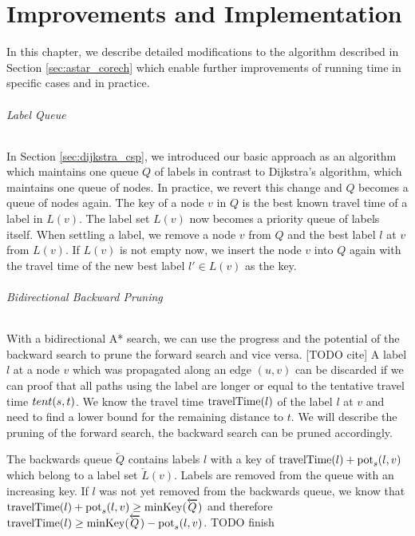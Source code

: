 
\chapter{Improvements and Implementation\label{ch:impl}}
In this chapter, we describe detailed modifications to the algorithm described in Section \ref{sec:astar_corech} which enable further improvements of running time in specific cases and in practice.

\subparagraph{Label Queue}
In Section \ref{sec:dijkstra_csp}, we introduced our basic approach as an algorithm which maintains one queue $Q$ of labels in contrast to Dijkstra's algorithm, which maintains one queue of nodes. In practice, we revert this change and $Q$ becomes a queue of nodes again. The key of a node $v$ in $Q$ is the best known travel time of a label in $L(v)$. The label set $L(v)$ now becomes a priority queue of labels itself. When settling a label, we remove a node $v$ from $Q$ and the best label $l$ at $v$ from $L(v)$. If $L(v)$ is not empty now, we insert the node $v$ into $Q$ again with the travel time of the new best label $l' \in L(v)$ as the key.

\subparagraph{Bidirectional Backward Pruning}
With a bidirectional A* search, we can use the progress and the potential of the backward search to prune the forward search and vice versa. [TODO cite] A label $l$ at a node $v$ which was propagated along an edge $(u,v)$ can be discarded if we can proof that all paths using the label are longer or equal to the tentative travel time $tent(s,t)$. We know the travel time $\operatorname{travelTime}(l)$ of the label $l$ at $v$ and need to find a lower bound for the remaining distance to $t$. We will describe the pruning of the forward search, the backward search can be pruned accordingly.

The backwards queue $\overleftarrow{Q}$ contains labels $l$ with a key of $\operatorname{travelTime}(l) + \operatorname{pot}_s(l,v)$ which belong to a label set $\overleftarrow{L}(v)$. Labels are removed from the queue with an increasing key. If $l$ was not yet removed from the backwards queue, we know that $\operatorname{travelTime}(l) + \operatorname{pot}_s(l,v) \ge \operatorname{minKey}(\overleftarrow{Q})$ and therefore $\operatorname{travelTime}(l) \ge \operatorname{minKey}(\overleftarrow{Q}) - \operatorname{pot}_s(l,v)$. TODO finish


